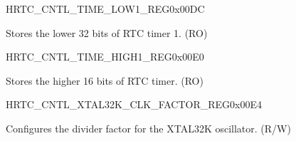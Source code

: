 \begin{register}{H}{RTC\_CNTL\_TIME\_LOW1\_REG}{0x00DC}\label{regdesc:RTCCNTLTIMELOW1REG}
%
\regnewline%
\begin{regdesc}\begin{reglist}
\label{fielddesc:RTCCNTLTIMERVALUE1LOW}\item [RTC\_CNTL\_TIMER\_VALUE1\_LOW] Stores the lower 32 bits of RTC timer 1. (RO)
\end{reglist}\end{regdesc}
\end{register}


\begin{register}{H}{RTC\_CNTL\_TIME\_HIGH1\_REG}{0x00E0}\label{regdesc:RTCCNTLTIMEHIGH1REG}
%
%
\regnewline%
\begin{regdesc}\begin{reglist}
\label{fielddesc:RTCCNTLTIMERVALUE1HIGH}\item [RTC\_CNTL\_TIMER\_VALUE1\_HIGH] Stores the higher 16 bits of RTC timer. (RO)
\end{reglist}\end{regdesc}
\end{register}


\begin{register}{H}{RTC\_CNTL\_XTAL32K\_CLK\_FACTOR\_REG}{0x00E4}\label{regdesc:RTCCNTLXTAL32KCLKFACTORREG}
%
\regnewline%
\begin{regdesc}\begin{reglist}
\label{fielddesc:RTCCNTLXTAL32KCLKFACTOR}\item [RTC\_CNTL\_XTAL32K\_CLK\_FACTOR] Configures the divider factor for the XTAL32K oscillator. (R/W)
\end{reglist}\end{regdesc}
\end{register}


